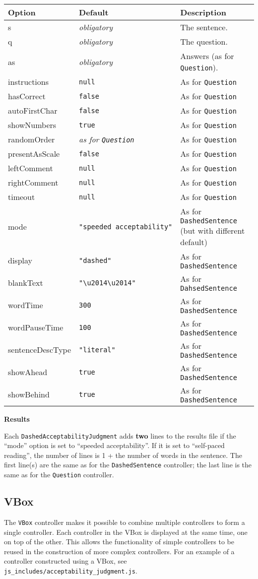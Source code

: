 \documentclass[]{article}
\begin{document}
\begin{longtable}[c]{p{1in}p{1in}p{3.85in}}
\toprule
\textbf{Option} & \textbf{Default} & \textbf{Description}\tabularnewline
\midrule
\endhead
s & \emph{obligatory} & The sentence.\tabularnewline
q & \emph{obligatory} & The question.\tabularnewline
as & \emph{obligatory} & Answers (as for
\texttt{Question}).\tabularnewline
instructions & \texttt{null} & As for \texttt{Question}\tabularnewline
hasCorrect & \texttt{false} & As for \texttt{Question}\tabularnewline
autoFirstChar & \texttt{false} & As for \texttt{Question}\tabularnewline
showNumbers & \texttt{true} & As for \texttt{Question}\tabularnewline
randomOrder & \emph{as for \texttt{Question}} & As for
\texttt{Question}\tabularnewline
presentAsScale & \texttt{false} & As for
\texttt{Question}\tabularnewline
leftComment & \texttt{null} & As for \texttt{Question}\tabularnewline
rightComment & \texttt{null} & As for \texttt{Question}\tabularnewline
timeout & \texttt{null} & As for \texttt{Question}\tabularnewline
mode & \texttt{"speeded\ acceptability"} & As for
\texttt{DashedSentence} (but with different default)\tabularnewline
display & \texttt{"dashed"} & As for
\texttt{DashedSentence}\tabularnewline
blankText & \texttt{"\textbackslash{}u2014\textbackslash{}u2014"} & As
for \texttt{DahsedSentence}\tabularnewline
wordTime & \texttt{300} & As for \texttt{DashedSentence}\tabularnewline
wordPauseTime & \texttt{100} & As for
\texttt{DashedSentence}\tabularnewline
sentenceDescType & \texttt{"literal"} & As for
\texttt{DashedSentence}\tabularnewline
showAhead & \texttt{true} & As for
\texttt{DashedSentence}\tabularnewline
showBehind & \texttt{true} & As for
\texttt{DashedSentence}\tabularnewline
\bottomrule
\end{longtable}

\textbf{Results}

Each \texttt{DashedAcceptabilityJudgment} adds \textbf{two} lines to the
results file if the ``mode'' option is set to ``speeded acceptability''.
If it is set to ``self-paced reading'', the number of lines is 1 + the
number of words in the sentence. The first line(s) are the same as for
the \texttt{DashedSentence} controller; the last line is the same as for
the \texttt{Question} controller.

\subsection{VBox}\label{vbox}

The \texttt{VBox} controller makes it possible to combine multiple
controllers to form a single controller. Each controller in the VBox is
displayed at the same time, one on top of the other. This allows the
functionality of simple controllers to be reused in the construction of
more complex controllers. For an example of a controller constructed
using a VBox, see \texttt{js\_includes/acceptability\_judgment.js}.
\end{document}
